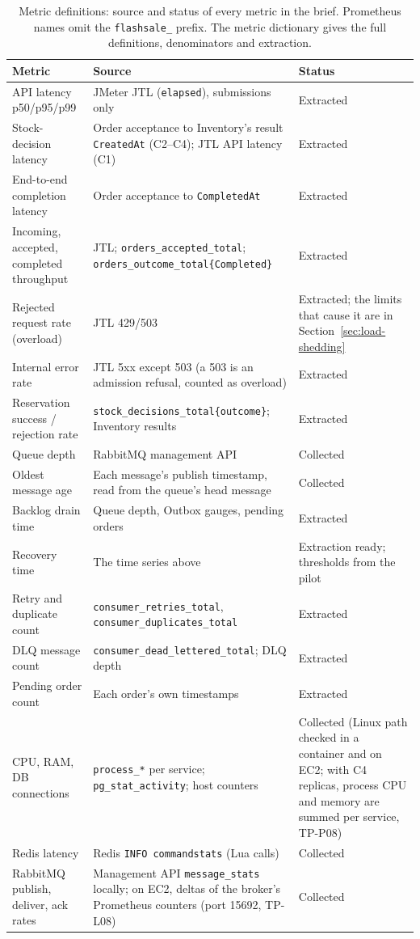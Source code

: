 \documentclass[a4paper]{report}
\begin{document}
\begin{table}[tbp]
\centering
\footnotesize
\caption{Metric definitions: source and status of every metric in the
brief. Prometheus names omit the \texttt{flashsale\_} prefix. The metric
dictionary gives the full definitions, denominators and extraction.}
\label{tab:metric-definitions}
\begin{tabular}{>{\raggedright\arraybackslash}p{3.4cm}>{\raggedright\arraybackslash}p{5.6cm}>{\raggedright\arraybackslash}p{3.6cm}}
\toprule
Metric & Source & Status \\
\midrule
API latency p50/p95/p99 & JMeter JTL (\texttt{elapsed}), submissions only & Extracted \\
Stock-decision latency & Order acceptance to Inventory's result
  \texttt{CreatedAt} (C2--C4); JTL API latency (C1) & Extracted \\
End-to-end completion latency & Order acceptance to \texttt{CompletedAt} & Extracted \\
Incoming, accepted, completed throughput & JTL; \texttt{orders\_accepted\_total};
  \texttt{orders\_outcome\_total\{Completed\}} & Extracted \\
Rejected request rate (overload) & JTL 429/503 & Extracted; the
  limits that cause it are in Section~\ref{sec:load-shedding} \\
Internal error rate & JTL 5xx except 503 (a 503 is an admission refusal,
  counted as overload) & Extracted \\
Reservation success / rejection rate & \texttt{stock\_decisions\_total\{outcome\}};
  Inventory results & Extracted \\
Queue depth & RabbitMQ management API & Collected \\
Oldest message age & Each message's publish timestamp, read from the
  queue's head message & Collected \\
Backlog drain time & Queue depth, Outbox gauges, pending orders & Extracted \\
Recovery time & The time series above & Extraction ready;
  thresholds from the pilot \\
Retry and duplicate count & \texttt{consumer\_retries\_total},
  \texttt{consumer\_duplicates\_total} & Extracted \\
DLQ message count & \texttt{consumer\_dead\_lettered\_total}; DLQ depth & Extracted \\
Pending order count & Each order's own timestamps & Extracted \\
CPU, RAM, DB connections & \texttt{process\_*} per service;
  \texttt{pg\_stat\_activity}; host counters & Collected (Linux path
  checked in a container and on EC2; with C4 replicas, process CPU and memory
  are summed per service, TP-P08) \\
Redis latency & Redis \texttt{INFO commandstats} (Lua calls) & Collected \\
RabbitMQ publish, deliver, ack rates & Management API \texttt{message\_stats}
  locally; on EC2, deltas of the broker's Prometheus counters (port 15692,
  TP-L08) & Collected \\
\bottomrule
\end{tabular}
\end{table}
\end{document}
